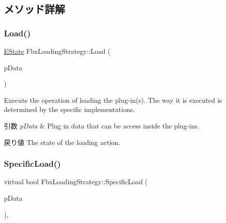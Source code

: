 \subsection{メソッド詳解}
\mbox{\label{class_fbx_loading_strategy_a3923744db719aaebabe262e2e3891d8a}} 
\subsubsection{\texorpdfstring{Load()}{Load()}}
{\footnotesize\ttfamily \hyperlink{class_fbx_loading_strategy_a2f61523e78f4bb06d46ccf3351d2bcdb}{E\+State} Fbx\+Loading\+Strategy\+::\+Load (\begin{DoxyParamCaption}\item[{\hyperlink{struct_fbx_plugin_data}{Fbx\+Plugin\+Data} \&}]{p\+Data }\end{DoxyParamCaption})}

Execute the operation of loading the plug-\/in(s). The way it is executed is determined by the specific implementations. 
\begin{DoxyParams}{引数}
{\em p\+Data} & Plug in data that can be access inside the plug-\/ins. \\
\hline
\end{DoxyParams}
\begin{DoxyReturn}{戻り値}
The state of the loading action. 
\end{DoxyReturn}
\mbox{\label{class_fbx_loading_strategy_a5e1fb1dd165eeb5d4670aab41bed1659}} 
\subsubsection{\texorpdfstring{Specific\+Load()}{SpecificLoad()}}
{\footnotesize\ttfamily virtual bool Fbx\+Loading\+Strategy\+::\+Specific\+Load (\begin{DoxyParamCaption}\item[{\hyperlink{struct_fbx_plugin_data}{Fbx\+Plugin\+Data} \&}]{p\+Data }\end{DoxyParamCaption})\hspace{0.3cm}{\ttfamily [protected]}, {}}

